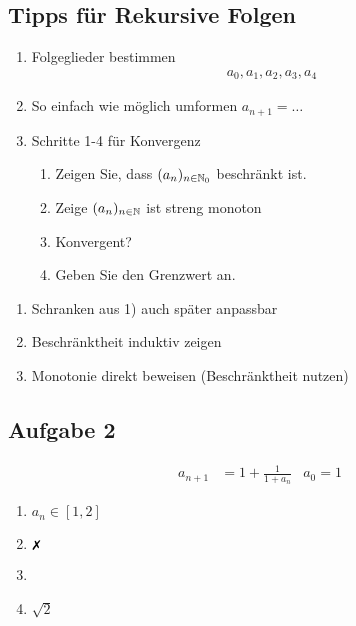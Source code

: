 \subsection{Tipps für Rekursive Folgen}
\begin{enumerate}[label=\alph*)]
    \item Folgeglieder bestimmen
    \begin{align*}
        a_0, a_1, a_2, a_3, a_4
    \end{align*}
    \item So einfach wie möglich umformen $a_{n+1} = \dots$
    \item Schritte 1-4 für Konvergenz
    \begin{enumerate}[label=\arabic*)]
        \item Zeigen Sie, dass $(a_n)_{n \in \mathbb N_0}$ beschränkt ist.
        \item Zeige $(a_n)_{n \in \mathbb N}$ ist streng monoton
        \item Konvergent?
        \item Geben Sie den Grenzwert an.
    \end{enumerate}
\end{enumerate}

\begin{enumerate}[label=$\Rightarrow$]
    \item Schranken aus 1) auch später anpassbar
    \item Beschränktheit induktiv zeigen
    \item Monotonie direkt beweisen (Beschränktheit nutzen)
\end{enumerate}

\subsection{Aufgabe 2}
\begin{align*}
    a_{n+1} &= 1 + \frac{1}{1 + a_n} & a_0 = 1
\end{align*}
\begin{enumerate}[label=\arabic*)]
    \item $a_n \in [1, 2]$
    \item $\xmark$
    \item 
    \item $\sqrt{2}$
\end{enumerate}